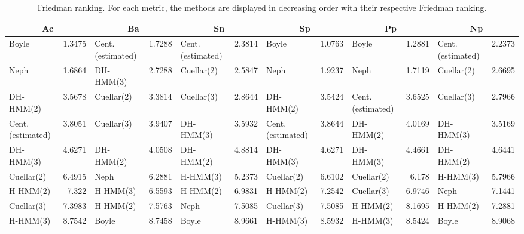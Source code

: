 \documentclass[landscape, 8pt]{report}
\begin{document}
\begin{table}[h!]
\label{tab:ranking}
\vspace{0.0cm}
\begin{center}
\caption{Friedman ranking. For each metric, the methods are displayed in decreasing order with their respective Friedman ranking.}
\renewcommand{\arraystretch}{1.2}
  \begin{tabular}{ |lr|lr|lr|lr|lr|lr| }
    \hline
    \multicolumn{2}{|c|}{\textbf{Ac}} & \multicolumn{2}{|c|}{\textbf{Ba}} & \multicolumn{2}{|c|}{\textbf{Sn}} & \multicolumn{2}{|c|}{\textbf{Sp}} & \multicolumn{2}{|c|}{\textbf{Pp}} & \multicolumn{2}{|c|}{\textbf{Np}} \\
    \hline
    Boyle & 1.3475 &     Cent.(estimated) & 1.7288 &     Cent.(estimated) & 2.3814 &     Boyle & 1.0763 &     Boyle & 1.2881 &     Cent.(estimated) & 2.2373 \\
    Neph & 1.6864 &     DH-HMM(3) & 2.7288 &     Cuellar(2) & 2.5847 &     Neph & 1.9237 &     Neph & 1.7119 &     Cuellar(2) & 2.6695 \\
    DH-HMM(2) & 3.5678 &     Cuellar(2) & 3.3814 &     Cuellar(3) & 2.8644 &     DH-HMM(2) & 3.5424 &     Cent.(estimated) & 3.6525 &     Cuellar(3) & 2.7966 \\
    Cent.(estimated) & 3.8051 &     Cuellar(3) & 3.9407 &     DH-HMM(3) & 3.5932 &     Cent.(estimated) & 3.8644 &     DH-HMM(2) & 4.0169 &     DH-HMM(3) & 3.5169 \\
    DH-HMM(3) & 4.6271 &     DH-HMM(2) & 4.0508 &     DH-HMM(2) & 4.8814 &     DH-HMM(3) & 4.6271 &     DH-HMM(3) & 4.4661 &     DH-HMM(2) & 4.6441 \\
    Cuellar(2) & 6.4915 &     Neph & 6.2881 &     H-HMM(3) & 5.2373 &     Cuellar(2) & 6.6102 &     Cuellar(2) & 6.178 &     H-HMM(3) & 5.7966 \\
    H-HMM(2) & 7.322 &     H-HMM(3) & 6.5593 &     H-HMM(2) & 6.9831 &     H-HMM(2) & 7.2542 &     Cuellar(3) & 6.9746 &     Neph & 7.1441 \\
    Cuellar(3) & 7.3983 &     H-HMM(2) & 7.5763 &     Neph & 7.5085 &     Cuellar(3) & 7.5085 &     H-HMM(2) & 8.1695 &     H-HMM(2) & 7.2881 \\
    H-HMM(3) & 8.7542 &     Boyle & 8.7458 &     Boyle & 8.9661 &     H-HMM(3) & 8.5932 &     H-HMM(3) & 8.5424 &     Boyle & 8.9068 \\
    \hline
  \end{tabular}
\end{center}
\vspace{0.0cm}
\end{table}
\end{document}
